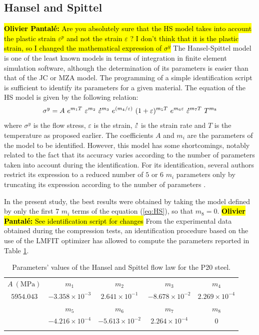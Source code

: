 \documentclass[twoside,english,1p,final,sort&compress]{elsarticle}
\theoremstyle{plain}
\newcommand{\mdot}[1]{\accentset{\mbox{\bfseries .}}{#1}}
\DeclareRobustCommand{\OP}[1]{ {\begingroup\sethlcolor{VWyellow}\textcolor{red}{\hl{\textbf{Olivier Pantal\'e:} #1}}\endgroup} }
\begin{document}
\subsection{Hansel and Spittel\label{sec:HSmodel}}

\OP{Are you absolutely sure that the HS model takes into account the plastic strain $\varepsilon^p$ and not the strain $\varepsilon$ ? I don't think that it is the plastic strain, so I changed the mathematical expression of $\sigma^y$}
The Hansel-Spittel model \cite{Hensel-1978} is one of the least known models in terms of integration in finite element simulation software, although the determination of its parameters is easier than that of the JC or MZA model. 
The programming of a simple identification script is sufficient to identify its parameters for a given material. 
The equation of the HS model is given by the following relation:
\begin{equation}
\sigma^y = A~e^{m_1T}~\varepsilon^{m_2}~\mdot\varepsilon^{m_3}~e^{({m_4}/{\varepsilon})}~(1+\varepsilon)^{m_5T}~e^{m_6\varepsilon}~\mdot\varepsilon^{m_7T}~T^{m_8}\label{eq:HS}
\end{equation}
where $\sigma^y$ is the flow stress, $\varepsilon$ is the strain, $\mdot\varepsilon$ is the strain rate and $T$ is the temperature as proposed earlier. 
The coefficients $A$ and $m_i$ are the parameters of the model to be identified. 
However, this model has some shortcomings, notably related to the fact that its accuracy varies according to the number of parameters taken into account during the identification. 
For its identification, several authors restrict its expression to a reduced number of $5$ or $6$ $m_i$ parameters only by truncating its expression according to the number of parameters \cite{Chadha-2018, Rudnytskyj-2020, Mehtedi-2015}. 

In the present study, the best results were obtained by taking the model defined by only the first $7$ $m_i$ terms of the equation (\ref{eq:HS}), so that $m_8=0$.\OP{See identification script for changes}
From the experimental data obtained during the compression tests, an identification procedure based on the use of the LMFIT optimizer \cite{Newville-2016} has allowed to compute the parameters reported in Table \ref{tab: HSparameters}. 
\begin{table}[h!]
\centering
\caption{Parameters' values of the Hansel and Spittel flow law for the P20 steel.}
\begin{tabular}{ccccc}
\hline
$A~(\text{MPa})$ & $m_1$ & $m_2$ & $m_3$ & $m_4$\\
$5954.043$ & $-3.358\times10^{-3}$ & $2.641\times10^{-1}$ & $-8.678\times10^{-2}$ & $2.269\times10^{-4}$\\\hline
& $m_5$ & $m_6$ & $m_7$ & $m_8$\\
& $-4.216\times10^{-4}$ & $-5.613\times10^{-2}$ & $2.264\times10^{-4}$ & $0$\\\hline
\label{tab: HSparameters}
\end{tabular}
\end{table}
\end{document}
